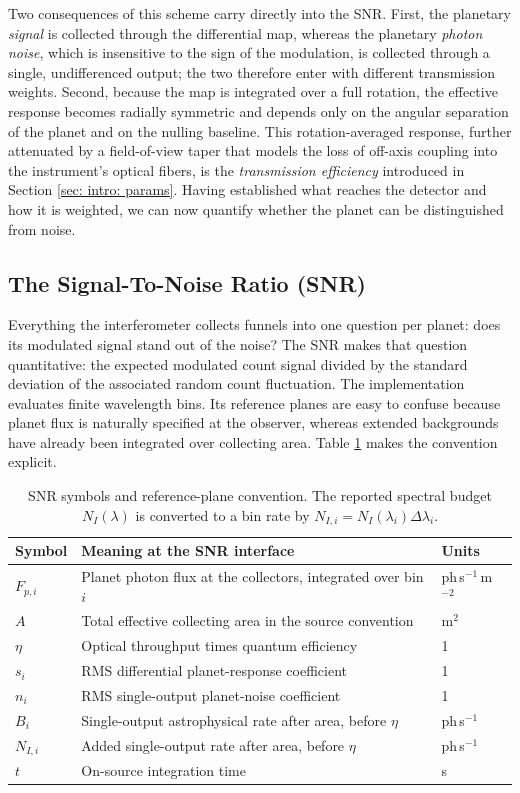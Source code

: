 \documentclass[12pt,a4paper]{article}
\numberwithin{equation}{section}
\numberwithin{figure}{section}
\numberwithin{table}{section}
\begin{document}
Two consequences of this scheme carry directly into the SNR. First, the planetary \textit{signal} is collected through the differential map, whereas the planetary \textit{photon noise}, which is insensitive to the sign of the modulation, is collected through a single, undifferenced output; the two therefore enter with different transmission weights. Second, because the map is integrated over a full rotation, the effective response becomes radially symmetric and depends only on the angular separation of the planet and on the nulling baseline. This rotation-averaged response, further attenuated by a field-of-view taper that models the loss of off-axis coupling into the instrument's optical fibers, is the \textit{transmission efficiency} introduced in Section \ref{sec: intro: params}. Having established what reaches the detector and how it is weighted, we can now quantify whether the planet can be distinguished from noise.

\subsection{The Signal-To-Noise Ratio (SNR)}
Everything the interferometer collects funnels into one question per planet: does its modulated signal stand out of the noise? The SNR makes that question quantitative: the expected modulated count signal divided by the standard deviation of the associated random count fluctuation. The implementation evaluates finite wavelength bins. Its reference planes are easy to confuse because planet flux is naturally specified at the observer, whereas extended backgrounds have already been integrated over collecting area. Table \ref{tab: snr symbols} makes the convention explicit.

\begin{table}[htbp]
\centering
\begin{tabular}{@{}lll@{}}
\toprule
Symbol & Meaning at the SNR interface & Units \\
\midrule
$F_{p,i}$ & Planet photon flux at the collectors, integrated over bin $i$ & ph\,s$^{-1}$\,m$^{-2}$ \\
$A$ & Total effective collecting area in the source convention & m$^2$ \\
$\eta$ & Optical throughput times quantum efficiency & 1 \\
$s_i$ & RMS differential planet-response coefficient & 1 \\
$n_i$ & RMS single-output planet-noise coefficient & 1 \\
$B_i$ & Single-output astrophysical rate after area, before $\eta$ & ph\,s$^{-1}$ \\
$N_{I,i}$ & Added single-output rate after area, before $\eta$ & ph\,s$^{-1}$ \\
$t$ & On-source integration time & s \\
\bottomrule
\end{tabular}
\caption{SNR symbols and reference-plane convention. The reported spectral budget $N_I(\lambda)$ is converted to a bin rate by $N_{I,i}=N_I(\lambda_i)\Delta\lambda_i$.}
\label{tab: snr symbols}
\end{table}
\end{document}
